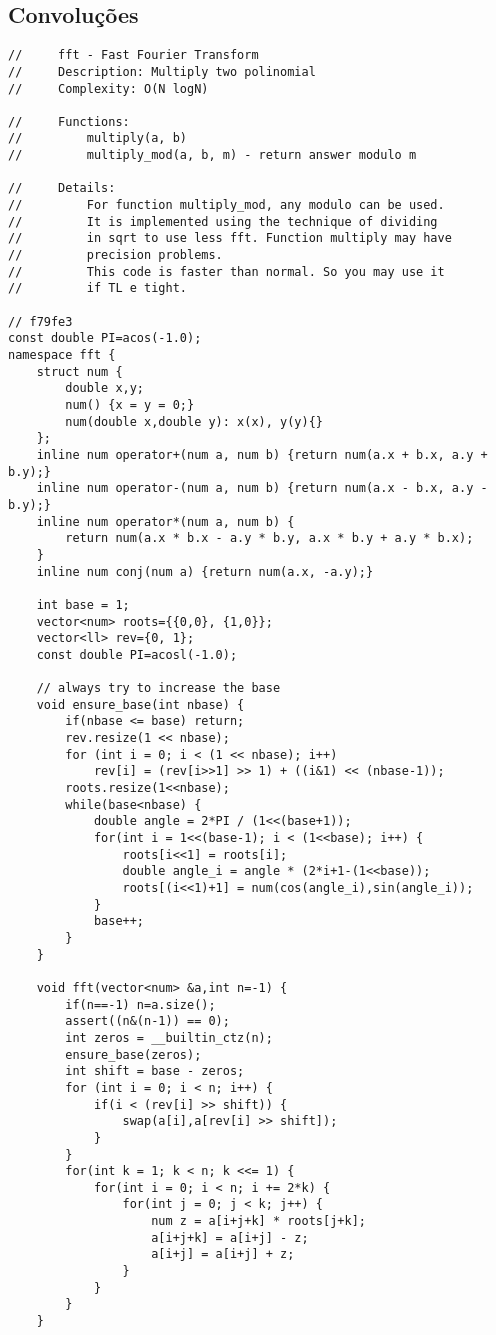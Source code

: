 \documentclass{article}
\begin{document}
\subsection{Convoluções}
\begin{verbatim}
//     fft - Fast Fourier Transform
//     Description: Multiply two polinomial
//     Complexity: O(N logN)

//     Functions:
//         multiply(a, b)
//         multiply_mod(a, b, m) - return answer modulo m

//     Details:
//         For function multiply_mod, any modulo can be used. 
//         It is implemented using the technique of dividing 
//         in sqrt to use less fft. Function multiply may have
//         precision problems.
//         This code is faster than normal. So you may use it
//         if TL e tight.

// f79fe3
const double PI=acos(-1.0);
namespace fft {
    struct num {
        double x,y;
        num() {x = y = 0;}
        num(double x,double y): x(x), y(y){}
    };
    inline num operator+(num a, num b) {return num(a.x + b.x, a.y + b.y);}
    inline num operator-(num a, num b) {return num(a.x - b.x, a.y - b.y);}
    inline num operator*(num a, num b) {
        return num(a.x * b.x - a.y * b.y, a.x * b.y + a.y * b.x);
    }
    inline num conj(num a) {return num(a.x, -a.y);}
 
    int base = 1;
    vector<num> roots={{0,0}, {1,0}};
    vector<ll> rev={0, 1};
    const double PI=acosl(-1.0);
 
    // always try to increase the base
    void ensure_base(int nbase) {
        if(nbase <= base) return;
        rev.resize(1 << nbase);
        for (int i = 0; i < (1 << nbase); i++)
            rev[i] = (rev[i>>1] >> 1) + ((i&1) << (nbase-1));
        roots.resize(1<<nbase);
        while(base<nbase) {
            double angle = 2*PI / (1<<(base+1));
            for(int i = 1<<(base-1); i < (1<<base); i++) {
                roots[i<<1] = roots[i];
                double angle_i = angle * (2*i+1-(1<<base));
                roots[(i<<1)+1] = num(cos(angle_i),sin(angle_i));
            }
            base++;
        }
    }
 
    void fft(vector<num> &a,int n=-1) {
        if(n==-1) n=a.size();
        assert((n&(n-1)) == 0);
        int zeros = __builtin_ctz(n);
        ensure_base(zeros);
        int shift = base - zeros;
        for (int i = 0; i < n; i++) {
            if(i < (rev[i] >> shift)) {
                swap(a[i],a[rev[i] >> shift]);
            }
        }
        for(int k = 1; k < n; k <<= 1) {
            for(int i = 0; i < n; i += 2*k) {
                for(int j = 0; j < k; j++) {
                    num z = a[i+j+k] * roots[j+k];
                    a[i+j+k] = a[i+j] - z;
                    a[i+j] = a[i+j] + z;
                }
            }
        }
    }
 

\end{verbatim}
\end{document}
